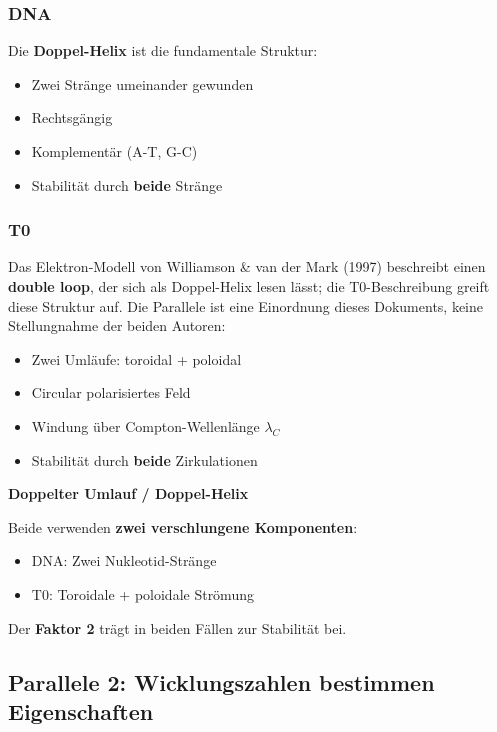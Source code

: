	\subsubsection{DNA}

	Die \textbf{Doppel-Helix} ist die fundamentale Struktur:
	\begin{itemize}
		\item Zwei Stränge umeinander gewunden
		\item Rechtsgängig
		\item Komplementär (A-T, G-C)
		\item Stabilität durch \textbf{beide} Stränge
	\end{itemize}

	\subsubsection{T0}

	Das Elektron-Modell von Williamson \& van der Mark (1997) beschreibt einen \textbf{double loop}, der sich als Doppel-Helix lesen lässt; die T0-Beschreibung greift diese Struktur auf. Die Parallele ist eine Einordnung dieses Dokuments, keine Stellungnahme der beiden Autoren:
	\begin{itemize}
		\item Zwei Umläufe: toroidal + poloidal
		\item Circular polarisiertes Feld
		\item Windung über Compton-Wellenlänge $\lambda_C$
		\item Stabilität durch \textbf{beide} Zirkulationen
	\end{itemize}

	\begin{keyresult}
		\textbf{Doppelter Umlauf / Doppel-Helix}

		Beide verwenden \textbf{zwei verschlungene Komponenten}:
		\begin{itemize}
			\item DNA: Zwei Nukleotid-Stränge
			\item T0: Toroidale + poloidale Strömung
		\end{itemize}

		Der \textbf{Faktor 2} trägt in beiden Fällen zur Stabilität bei.
	\end{keyresult}

	\subsection{Parallele 2: Wicklungszahlen bestimmen Eigenschaften}


